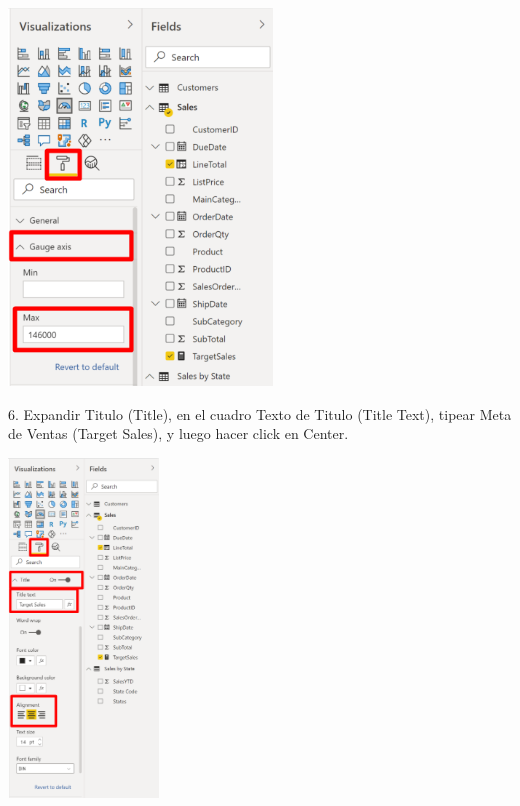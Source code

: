 \documentclass[12pt,letterpaper]{article}
\begin{document}
\begin{center}
    \includegraphics[width=7cm]{img/75.png}
    \vspace{1cm}
\end{center}
6. Expandir Titulo (Title), en el cuadro Texto de Titulo (Title Text), tipear Meta de Ventas (Target Sales), y
luego hacer click en Center.
\begin{center}
    \includegraphics[width=4cm]{img/76.png}
\end{center}
\end{document}

